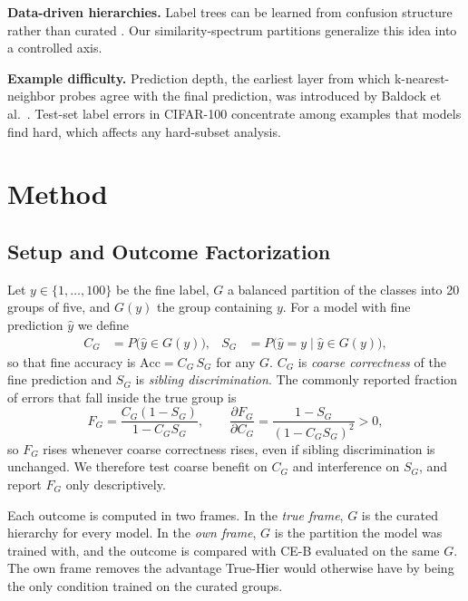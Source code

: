 \documentclass[conference]{IEEEtran}
\begin{document}
\textbf{Data-driven hierarchies.} Label trees can be learned from confusion structure rather than curated \cite{bengio2010trees}. Our similarity-spectrum partitions generalize this idea into a controlled axis.

\textbf{Example difficulty.} Prediction depth, the earliest layer from which k-nearest-neighbor probes agree with the final prediction, was introduced by Baldock et al.\ \cite{baldock2021difficulty}. Test-set label errors in CIFAR-100 \cite{northcutt2021labelerrors} concentrate among examples that models find hard, which affects any hard-subset analysis.

\section{Method}
\label{sec:method}

\subsection{Setup and Outcome Factorization}
Let $y\in\{1,\ldots,100\}$ be the fine label, $G$ a balanced partition of the classes into 20 groups of five, and $G(y)$ the group containing $y$. For a model with fine prediction $\hat y$ we define
\begin{equation}
\begin{aligned}
C_G &= P\big(\hat y\in G(y)\big), &
S_G &= P\big(\hat y=y \mid \hat y\in G(y)\big),
\end{aligned}
\label{eq:factor}
\end{equation}
so that fine accuracy is $\mathrm{Acc}=C_G\,S_G$ for any $G$. $C_G$ is \emph{coarse correctness} of the fine prediction and $S_G$ is \emph{sibling discrimination}. The commonly reported fraction of errors that fall inside the true group is
\begin{equation}
F_G=\frac{C_G(1-S_G)}{1-C_G S_G},\qquad \frac{\partial F_G}{\partial C_G}=\frac{1-S_G}{(1-C_GS_G)^2}>0,
\label{eq:within}
\end{equation}
so $F_G$ rises whenever coarse correctness rises, even if sibling discrimination is unchanged. We therefore test coarse benefit on $C_G$ and interference on $S_G$, and report $F_G$ only descriptively.

Each outcome is computed in two frames. In the \emph{true frame}, $G$ is the curated hierarchy for every model. In the \emph{own frame}, $G$ is the partition the model was trained with, and the outcome is compared with CE-B evaluated on the same $G$. The own frame removes the advantage True-Hier would otherwise have by being the only condition trained on the curated groups.
\end{document}
